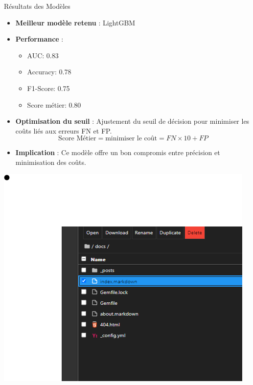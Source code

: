 \documentclass{beamer}
\begin{document}
\begin{frame}{Résultats des Modèles}
    \begin{itemize}
        \item \textbf{Meilleur modèle retenu} : LightGBM
        \item \textbf{Performance} :
            \begin{itemize}
                \item AUC: 0.83
                \item Accuracy: 0.78
                \item F1-Score: 0.75
                \item Score métier: 0.80
            \end{itemize}
        \item \textbf{Optimisation du seuil} : Ajustement du seuil de décision pour minimiser les coûts liés aux erreurs FN et FP.
        \[
        \text{Score Métier} = \text{minimiser le coût} = FN \times 10 + FP
        \]
        \item \textbf{Implication} : Ce modèle offre un bon compromis entre précision et minimisation des coûts.
    \end{itemize}
    \includegraphics[width=\textwidth]{assets/test.png} %
\end{frame}
\end{document}
